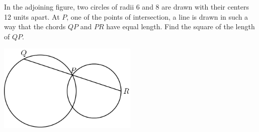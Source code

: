 In the adjoining figure, two circles of radii 6 and 8 are drawn with their centers 12 units apart.  At $P$, one of the points of intersection, a line is drawn in such a way that the chords $QP$ and $PR$ have equal length.  Find the square of the length of $QP$.

\begin{center}
\includegraphics[width = 66.4mm]{img/fig0.png}
\end{center}